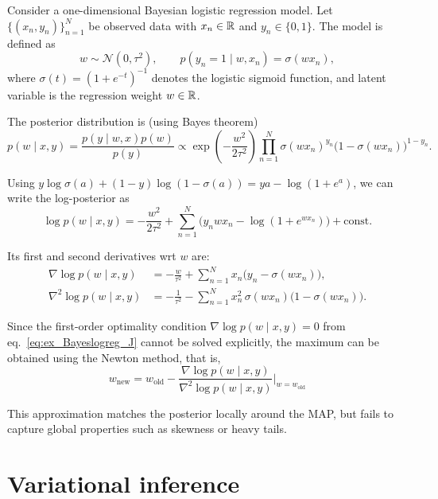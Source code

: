 \begin{example}
Consider a one-dimensional Bayesian logistic regression model.
Let $\{(x_n,y_n)\}_{n=1}^N$ be observed data with $x_n\in{\mathbb R}$ and $y_n\in\{0,1\}$. The model is defined as
\[
w \sim \mathcal N(0,\tau^2),
\qquad
p(y_n=1 \mid w,x_n) = \sigma(wx_n),
\]
where $\sigma(t) = (1+e^{-t})^{-1}$ denotes the logistic sigmoid function, and latent variable is the regression weight $w\in{\mathbb R}$.

The posterior distribution is (using Bayes theorem)
\[
p(w\mid x,y)
=
\frac{p(y\mid w,x)p(w)}{p(y)}
\propto
\exp\!\left(-\frac{w^2}{2\tau^2}\right)
\prod_{n=1}^N
\sigma(wx_n)^{y_n}\bigl(1-\sigma(wx_n)\bigr)^{1-y_n}.
\]

Using $y\log\sigma(a)+(1-y)\log(1-\sigma(a)) = ya-\log(1+e^{a})$, we can write the log-posterior as
\[
\log p(w\mid x,y)
=
-\frac{w^2}{2\tau^2}
+\sum_{n=1}^N\Big(
y_n w x_n - \log(1+e^{w x_n})
\Big)
+\text{const}.
\]

Its first and second derivatives wrt $w$ are:
\begin{align}
  \nabla \log p(w\mid x,y)
  &=
  -\frac{w}{\tau^2}
  +\sum_{n=1}^N x_n\Big(y_n-\sigma(w x_n)\Big),\label{eq:ex_Bayeslogreg_J}
  \\[4pt]
  \nabla^2 \log p(w\mid x,y)
  &=
  -\frac{1}{\tau^2}
  -\sum_{n=1}^N x_n^2\,\sigma(w x_n)\bigl(1-\sigma(w x_n)\bigr).
  \label{eq:ex_Bayeslogreg_H}
\end{align}

Since the first-order optimality condition $\nabla \log p(w\mid x,y)=0$ from eq.~\eqref{eq:ex_Bayeslogreg_J} cannot be solved explicitly, the maximum can be obtained using the Newton method, that is, 
\[
w_\text{new} = w_\text{old} - \frac{\nabla \log p(w\mid x,y)}{\nabla^2 \log p(w\mid x,y)}\bigg|_{w=w_\text{old}}
\]

This approximation matches the posterior locally around the MAP, but fails to
capture global properties such as skewness or heavy tails.




\end{example}



\section{Variational inference}

